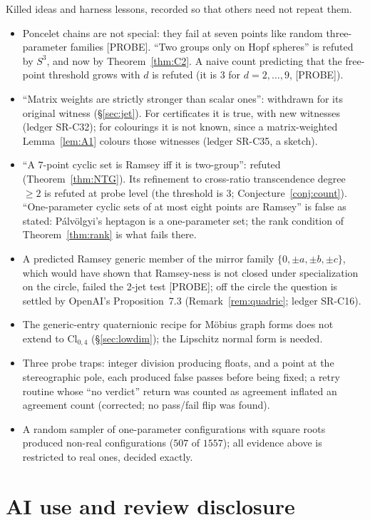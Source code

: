 \documentclass[11pt]{amsart}
\newcommand{\st}[1]{\textsf{[#1]}}
\newcommand{\Cl}{\mathrm{Cl}}
\theoremstyle{plain}
\theoremstyle{definition}
\begin{document}
Killed ideas and harness lessons, recorded so that others need not repeat them.
\begin{itemize}
\item Poncelet chains are not special: they fail at seven points like random three-parameter families
\st{PROBE}. ``Two groups only on Hopf spheres'' is refuted by $S^3$, and now by
Theorem~\ref{thm:C2}. A naive count predicting that the free-point threshold grows with $d$ is refuted (it
is $3$ for $d=2,\dots,9$, \st{PROBE}).
\item ``Matrix weights are strictly stronger than scalar ones'': withdrawn for its original witness
(\S\ref{sec:jet}). For certificates it is true, with new witnesses (ledger SR-C32); for colourings it is
not known, since a matrix-weighted Lemma~\ref{lem:A1} colours those witnesses (ledger SR-C35, a sketch).
\item ``A $7$-point cyclic set is Ramsey iff it is two-group'': refuted (Theorem~\ref{thm:NTG}). Its
refinement to cross-ratio transcendence degree $\ge2$ is refuted at probe level (the threshold is $3$;
Conjecture~\ref{conj:count}). ``One-parameter cyclic sets of at most eight points are Ramsey'' is false as
stated: P\'alv\"olgyi's heptagon is a one-parameter set; the rank condition of Theorem~\ref{thm:rank} is
what fails there.
\item A predicted Ramsey generic member of the mirror family $\{0,\pm a,\pm b,\pm c\}$, which would have
shown that Ramsey-ness is not closed under specialization on the circle, failed the 2-jet test
\st{PROBE}; off the circle the question is settled by OpenAI's Proposition~7.3
(Remark~\ref{rem:quadric}; ledger SR-C16).
\item The generic-entry quaternionic recipe for M\"obius graph forms does not extend to $\Cl_{0,4}$
(\S\ref{sec:lowdim}); the Lipschitz normal form is needed.
\item Three probe traps: integer division producing floats, and a point at the stereographic pole, each
produced false passes before being fixed; a retry routine whose ``no verdict'' return was counted as
agreement inflated an agreement count (corrected; no pass/fail flip was found).
\item A random sampler of one-parameter configurations with square roots produced non-real configurations
($507$ of $1557$); all evidence above is restricted to real ones, decided exactly.
\end{itemize}

\section{AI use and review disclosure}\label{sec:disclosure}
\end{document}
